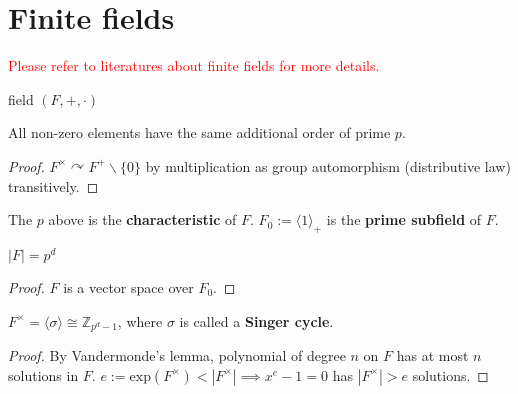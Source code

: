 \documentclass[a4paper,11pt]{article}
\def\maintitle#1{\section*{#1}}
\def\subtitle#1{\section{#1}}
\begin{document}
\else %
    \ifx\chaptitle\undefined %
        \def\maintitle#1{\subsection{#1}}
        \def\subtitle#1{\subsubsection{#1}}
    \else %
        \def\maintitle#1{\section{#1}}
        \def\subtitle#1{\subsection{#1}}
    \fi
\fi

\maintitle{Finite fields}

\textcolor{red}{Please refer to literatures about finite fields for more details.}

\begin{definition}
    field $(F,+,\cdot)$
\end{definition}

\begin{lemma}
    All non-zero elements have the same additional order of prime $p$.
\end{lemma}
\begin{proof}
    $F^\times\curvearrowright F^+\backslash\{0\}$ by multiplication as group automorphism (distributive law) transitively.
\end{proof}

\begin{definition}
    The $p$ above is the \textbf{characteristic} of $F$. $F_0:=\langle 1\rangle_+$ is the \textbf{prime subfield} of $F$.
\end{definition}

\begin{lemma}
    $|F|=p^d$
\end{lemma} 
\begin{proof}
    $F$ is a vector space over $F_0$.
\end{proof}

\begin{lemma}
    $F^\times=\langle \sigma\rangle\cong\mathbb{Z}_{p^d-1}$, where $\sigma$ is called a \textbf{Singer cycle}.
\end{lemma}
\begin{proof}
    By Vandermonde's lemma, polynomial of degree $n$ on $F$ has at most $n$ solutions in $F$. $e:=\mathrm{exp}(F^\times)<|F^\times|\implies x^e-1=0$ has $|F^\times|>e$ solutions.
\end{proof}
\end{document}
